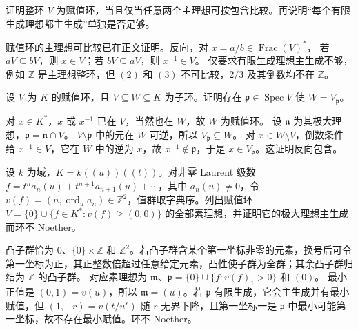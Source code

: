 \begin{exercise}\label{b3:ex:10-principal-comparison}
	证明整环 \(V\) 为赋值环，当且仅当任意两个主理想可按包含比较。再说明“每个有限生成理想都主生成”单独是否足够。
\end{exercise}
\begin{solution}
	赋值环的主理想可比较已在正文证明。反向，对 \(x=a/b\in\operatorname{Frac}(V)^*\)， 若 \(aV\subseteq bV\)，则 \(x\in V\)；若 \(bV\subseteq aV\)，则 \(x^{-1}\in V\)。 仅要求有限生成理想主生成不够，例如 \(\mathbb Z\) 是主理想整环，但 \((2)\) 和 \((3)\) 不可比较，\(2/3\) 及其倒数均不在 \(\mathbb Z\)。
\end{solution}

\begin{exercise}\label{b3:ex:10-overrings}
	设 \(V\) 为 \(K\) 的赋值环，且 \(V\subseteq W\subseteq K\) 为子环。证明存在 \(\mathfrak p\in\operatorname{Spec}V\) 使 \(W=V_{\mathfrak p}\)。
\end{exercise}
\begin{solution}
	对 \(x\in K^*\)，\(x\) 或 \(x^{-1}\) 已在 \(V\)，当然也在 \(W\)，故 \(W\) 为赋值环。 设 \(\mathfrak n\) 为其极大理想，\(\mathfrak p=\mathfrak n\cap V\)。 \(V\setminus\mathfrak p\) 中的元在 \(W\) 可逆，所以 \(V_{\mathfrak p}\subseteq W\)。 对 \(x\in W\setminus V\)，倒数条件给 \(x^{-1}\in V\)，它在 \(W\) 中的逆为 \(x\)，故 \(x^{-1}\notin\mathfrak p\)，于是 \(x\in V_{\mathfrak p}\)。这证明反向包含。
\end{solution}

\begin{exercise}\label{b3:ex:10-lexicographic-primes}
	设 \(k\) 为域，\(K=k(\!(u)\!)(\!(t)\!)\)。对非零 Laurent 级数 \(f=t^n a_n(u)+t^{n+1}a_{n+1}(u)+\cdots\)，其中 \(a_n(u)\ne0\)，令 \(v(f)=(n,\operatorname{ord}_u a_n)\in\mathbb Z^2\)，值群取字典序。列出赋值环 \(V=\{0\}\cup\{f\in K^*:v(f)\ge(0,0)\}\) 的全部素理想，并证明它的极大理想主生成而环不 Noether。
\end{exercise}
\begin{solution}
	凸子群恰为 \(0\)、\(\{0\}\times\mathbb Z\) 和 \(\mathbb Z^2\)。若凸子群含某个第一坐标非零的元素，换号后可令第一坐标为正，其正整数倍超过任意给定元素，凸性使子群为全群；其余凸子群归结为 \(\mathbb Z\) 的凸子群。 对应素理想为 \(\mathfrak m\)、\(\mathfrak p=\{0\}\cup\bigl\{f:v(f)_1>0\bigr\}\) 和 \((0)\)。 最小正值是 \((0,1)=v(u)\)，所以 \(\mathfrak m=(u)\)。若 \(\mathfrak p\) 有限生成，它会主生成并有最小赋值，但 \((1,-r)=v(t/u^r)\) 随 \(r\) 无界下降，且第一坐标一是 \(\mathfrak p\) 中最小可能第一坐标，故不存在最小赋值。环不 Noether。
\end{solution}

